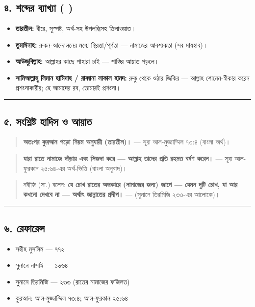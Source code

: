 \subsection*{৪. শব্দের ব্যাখ্যা ( )}

\begin{itemize}
\item \textbf{তারতীল:} ধীরে, সুস্পষ্ট, অর্থ-সহ উপলব্ধিসহ তিলাওয়াত।
\item \textbf{তুমাঈনাহ:} রুকন-আন্দোলনের মধ্যে স্থিরতা/পূর্ণতা — নামাজের আবশ্যকতা (সব মাযহাব)।
\item \textbf{আউজুবিল্লাহ:} আল্লাহর কাছে পাহারা চাই — শাস্তির আয়াত পড়লে।
\item \textbf{সামিআল্লাহু লিমান হামিদাহ / রাব্বানা লাকাল হামদ:} রুকু থেকে ওঠার জিকির — আল্লাহ শোনেন-স্বীকার করেন প্রশংসাকারীর; হে আমাদের রব, তোমারই প্রশংসা।
\end{itemize}
\medskip\hrule\medskip

\subsection*{৫. সংশ্লিষ্ট হাদিস ও আয়াত}

\begin{quote}
\textbf{অতঃপর কুরআন পড়ো নিয়ম অনুযায়ী (তারতীল)।} — সূরা আল-মুজ্জাম্মিল ৭৩:৪ (বাংলা অর্থ)।
\end{quote}

\begin{quote}
\textbf{যারা রাতে নামাজে দাঁড়ায় এবং সিজদা করে — আল্লাহ তাদের প্রতি রহমত বর্ষণ করেন।} — সূরা আল-ফুরকান ২৫:৬৪-এর অর্থ-ভিত্তি (বাংলা অনুবাদ)।
\end{quote}

\begin{quote}
নবীজি (সা.) বলেন: \textbf{যে চোখ রাতের অন্ধকারে (নামাজের জন্য) জাগে — যেমন দুটি চোখ, যা আর কখনো দেখবে না — অর্থাৎ জান্নাতের প্রদীপ।} — (সুনানে তিরমিজি ২৩৩-এর আলোকে)।
\end{quote}

\medskip\hrule\medskip

\subsection*{৬. রেফারেন্স}

\begin{itemize}
\item সহীহ মুসলিম — ৭৭২
\item সুনানে নাসাঈ — ১৬৬৪
\item সুনানে তিরমিজি — ২৩৩ (রাতের নামাজের ফজিলত)
\item কুরআন: আল-মুজ্জাম্মিল ৭৩:৪; আল-ফুরকান ২৫:৬৪
\end{itemize}



